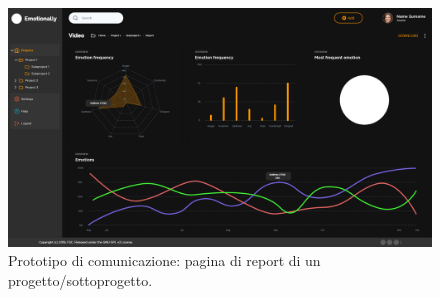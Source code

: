 \begin{figure}[H]
	\centering
	\caption{Prototipo di comunicazione: pagina di report di un progetto/sottoprogetto.}
	\label{fig:prototipo-comunicazione:project-report}
	\includegraphics[width=\textwidth]{images/prototipo-comunicazione/report project.png}
\end{figure}

